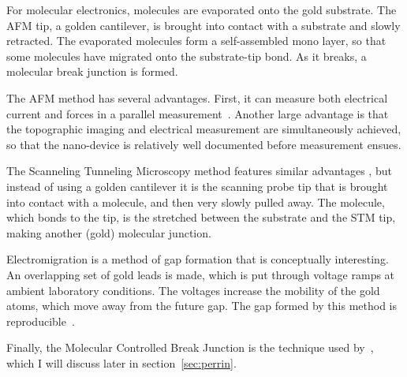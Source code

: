 For molecular electronics, molecules are evaporated onto the gold substrate. The AFM tip, a golden cantilever, is brought into contact with a substrate and slowly retracted. The evaporated molecules form a self-assembled mono layer, so that some molecules have migrated onto the substrate-tip bond. As it breaks, a molecular break junction is formed.

The AFM method has several advantages. First, it can measure both electrical current and forces in a parallel measurement~\cite{nef}. Another large advantage is that the topographic imaging and electrical measurement are simultaneously achieved, so that the nano-device is relatively well documented before measurement ensues.

The Scanneling Tunneling Microscopy method features similar advantages \cite{Joachim2000}, but instead of using a golden cantilever it is the scanning probe tip that is brought into contact with a molecule, and then very slowly pulled away. The molecule, which bonds to the tip, is the stretched between the substrate and the STM tip, making another (gold) molecular junction.

Electromigration is a method of gap formation that is conceptually interesting. An overlapping set of gold leads is made, which is put through voltage ramps at ambient laboratory conditions. The voltages increase the mobility of the gold atoms, which move away from the future gap. The gap formed by this method is reproducible~\cite{electromigration}.

Finally, the Molecular Controlled Break Junction is the technique used by~\citet{perrinnano}, which I will discuss later in section~\ref{sec:perrin}. 

